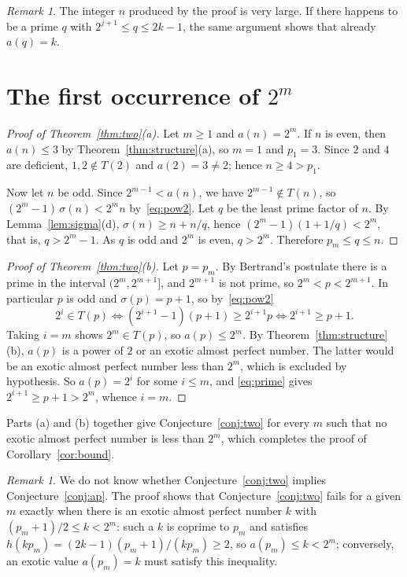 \documentclass[12pt,reqno]{article}
\theoremstyle{plain}
\theoremstyle{definition}
\theoremstyle{remark}
\newtheorem{remark}[theorem]{Remark}
\begin{document}
\begin{remark}
The integer $n$ produced by the proof is very large. If there happens to be a
prime $q$ with $2^{j+1} \le q \le 2k-1$, the same argument shows that already
$a(q) = k$.
\end{remark}

\section{The first occurrence of \texorpdfstring{$2^m$}{2\^{}m}}

\begin{proof}[Proof of Theorem~\ref{thm:two}(a)]
Let $m \ge 1$ and $a(n) = 2^m$. If $n$ is even, then $a(n) \le 3$ by
Theorem~\ref{thm:structure}(a), so $m = 1$ and $p_1 = 3$. Since $2$ and $4$ are
deficient, $1, 2 \notin T(2)$ and $a(2) = 3 \neq 2$; hence $n \ge 4 > p_1$.

Now let $n$ be odd. Since $2^{m-1} < a(n)$, we have $2^{m-1} \notin T(n)$, so
$(2^m - 1)\,\sigma(n) < 2^m n$ by~\eqref{eq:pow2}. Let $q$ be the least prime
factor of $n$. By Lemma~\ref{lem:sigma}(d), $\sigma(n) \ge n + n/q$, hence
$(2^m-1)(1 + 1/q) < 2^m$, that is, $q > 2^m - 1$. As $q$ is odd and $2^m$ is
even, $q > 2^m$. Therefore $p_m \le q \le n$.
\end{proof}

\begin{proof}[Proof of Theorem~\ref{thm:two}(b)]
Let $p = p_m$. By Bertrand's postulate \cite[Theorem 418]{hw} there is a prime
in the interval $(2^m, 2^{m+1}]$, and $2^{m+1}$ is not prime, so
$2^m < p < 2^{m+1}$. In particular $p$ is odd and $\sigma(p) = p+1$, so
by~\eqref{eq:pow2}
\begin{equation}\label{eq:prime}
  2^i \in T(p) \iff (2^{i+1}-1)(p+1) \ge 2^{i+1}p \iff 2^{i+1} \ge p+1 .
\end{equation}
Taking $i = m$ shows $2^m \in T(p)$, so $a(p) \le 2^m$. By
Theorem~\ref{thm:structure}(b), $a(p)$ is a power of $2$ or an exotic almost
perfect number. The latter would be an exotic almost perfect number less than
$2^m$, which is excluded by hypothesis. So $a(p) = 2^i$ for some $i \le m$, and \eqref{eq:prime} gives
$2^{i+1} \ge p + 1 > 2^m$, whence $i = m$.
\end{proof}

Parts (a) and (b) together give Conjecture~\ref{conj:two} for every $m$ such
that no exotic almost perfect number is less than $2^m$, which completes the
proof of Corollary~\ref{cor:bound}.

\begin{remark}
We do not know whether Conjecture~\ref{conj:two} implies
Conjecture~\ref{conj:ap}. The proof shows that Conjecture~\ref{conj:two} fails
for a given $m$ exactly when there is an exotic almost perfect number $k$ with
$(p_m+1)/2 \le k < 2^m$: such a $k$ is coprime to $p_m$ and satisfies
$h(k p_m) = (2k-1)(p_m+1)/(k p_m) \ge 2$, so $a(p_m) \le k < 2^m$; conversely, an
exotic value $a(p_m) = k$ must satisfy this inequality.
\end{remark}
\end{document}
